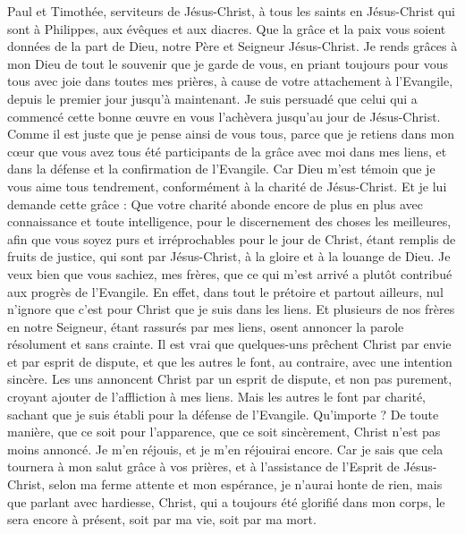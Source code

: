 \begin{multicols}{2}
\TextTitle{[Introduction]}
\VerseOne{}Paul et Timothée, serviteurs de Jésus-Christ, à tous les saints en Jésus-Christ qui sont à Philippes, aux évêques et aux diacres.
Que la grâce et la paix vous soient données de la part de Dieu, notre Père et Seigneur Jésus-Christ.
Je rends grâces à mon Dieu de tout le souvenir que je garde de vous,
en priant toujours pour vous tous avec joie dans toutes mes prières,
à cause de votre attachement à l'Evangile, depuis le premier jour jusqu'à maintenant.
Je suis persuadé que celui qui a commencé cette bonne œuvre en vous l'achèvera jusqu'au jour de Jésus-Christ.
Comme il est juste que je pense ainsi de vous tous, parce que je retiens dans mon cœur que vous avez tous été participants de la grâce avec moi dans mes liens, et dans la défense et la confirmation de l'Evangile.
Car Dieu m'est témoin que je vous aime tous tendrement, conformément à la charité de Jésus-Christ.
Et je lui demande cette grâce : Que votre charité abonde encore de plus en plus avec connaissance et toute intelligence,
pour le discernement des choses les meilleures, afin que vous soyez purs et irréprochables pour le jour de Christ,
étant remplis de fruits de justice, qui sont par Jésus-Christ, à la gloire et à la louange de Dieu.
Je veux bien que vous sachiez, mes frères, que ce qui m’est arrivé a plutôt contribué aux progrès de l'Evangile.
En effet, dans tout le prétoire et partout ailleurs, nul n’ignore que c’est pour Christ que je suis dans les liens.
Et plusieurs de nos frères en notre Seigneur, étant rassurés par mes liens, osent annoncer la parole résolument et sans crainte.
Il est vrai que quelques-uns prêchent Christ par envie et par esprit de dispute, et que les autres le font, au contraire, avec une intention sincère.
Les uns annoncent Christ par un esprit de dispute, et non pas purement, croyant ajouter de l'affliction à mes liens.
Mais les autres le font par charité, sachant que je suis établi pour la défense de l'Evangile.
Qu’importe ? De toute manière, que ce soit pour l’apparence, que ce soit sincèrement, Christ n’est pas moins annoncé. Je m’en réjouis, et je m’en réjouirai encore.
Car je sais que cela tournera à mon salut grâce à vos prières, et à l’assistance de l'Esprit de Jésus-Christ,
selon ma ferme attente et mon espérance, je n’aurai honte de rien, mais que parlant avec hardiesse, Christ, qui a toujours été glorifié dans mon corps, le sera encore à présent, soit par ma vie, soit par ma mort.

\end{multicols}
